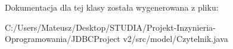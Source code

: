 Dokumentacja dla tej klasy została wygenerowana z pliku\+:\begin{DoxyCompactItemize}
\item 
C\+:/\+Users/\+Mateusz/\+Desktop/\+S\+T\+U\+D\+I\+A/\+Projekt-\/\+Inzynieria-\/\+Oprogramowania/\+J\+D\+B\+C\+Project v2/src/model/Czytelnik.\+java\end{DoxyCompactItemize}

